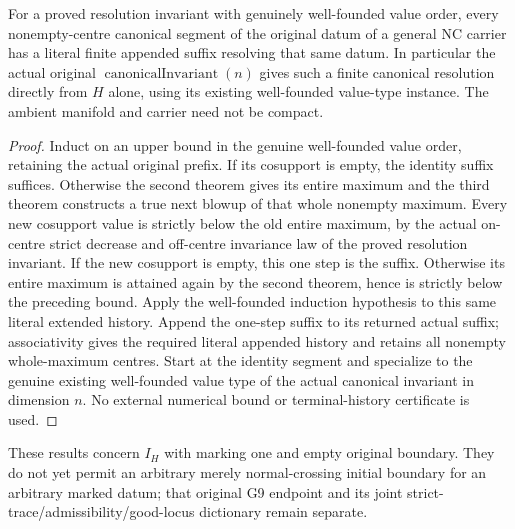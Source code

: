 \begin{theorem}
\label{hir:general-nc-actual-global-canonical-finite-resolution}
\leanok
For a proved resolution invariant with genuinely well-founded value
order, every nonempty-centre canonical segment of the original datum
of a general NC carrier has a literal finite appended suffix resolving
that same datum. In particular the actual original
$\operatorname{canonicalInvariant}(n)$ gives such a finite canonical
resolution directly from $H$ alone, using its existing well-founded
value-type instance. The ambient manifold and carrier need not be compact.
\end{theorem}
\begin{proof}
Induct on an upper bound in the genuine well-founded value order,
retaining the actual original prefix. If its cosupport is empty, the
identity suffix suffices. Otherwise the second theorem gives its entire
maximum and the third theorem constructs a true next blowup of that
whole nonempty maximum. Every new cosupport value is strictly below
the old entire maximum, by the actual on-centre strict decrease and
off-centre invariance law of the proved resolution invariant. If the
new cosupport is empty, this one step is the suffix. Otherwise its
entire maximum is attained again by the second theorem, hence is
strictly below the preceding bound. Apply the well-founded induction
hypothesis to this same literal extended history. Append the one-step
suffix to its returned actual suffix; associativity gives the required
literal appended history and retains all nonempty whole-maximum centres.
Start at the identity segment and specialize to the genuine existing
well-founded value type of the actual canonical invariant in dimension
$n$. No external numerical bound or terminal-history certificate is used.
\end{proof}

These results concern $I_H$ with marking one and empty original boundary.
They do not yet permit an arbitrary merely normal-crossing initial
boundary for an arbitrary marked datum; that original G9 endpoint and
its joint strict-trace/admissibility/good-locus dictionary remain separate.
